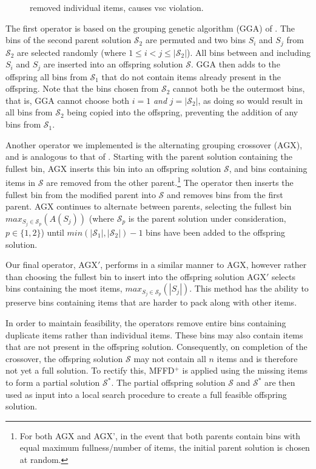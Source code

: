 \documentclass[authoryear]{elsarticle}
\begin{document}
\begin{figure}[H]	
	\centering
	
	\caption{removed individual items, causes vsc violation.}	
	\label{fig:eavsc}
\end{figure}

The first operator is based on the grouping genetic algorithm (GGA) of \citet{falkenauer1992}. The bins of the second parent solution $\mathcal{S}_2$ are permuted and two bins $S_i$ and $S_j$ from $\mathcal{S}_2$ are selected randomly (where $1 \leq i < j \leq |\mathcal{S}_2|$). All bins between and including $S_i$ and $S_j$ are inserted into an offspring solution $\mathcal{S}$. GGA then adds to the offspring all bins from $\mathcal{S}_1$ that do not contain items already present in the offspring. Note that the bins chosen from $\mathcal{S}_2$ cannot both be the outermost bins, that is, GGA cannot choose both $i = 1$ \emph{and} $j = |\mathcal{S}_2|$, as doing so would result in all bins from $\mathcal{S}_2$ being copied into the offspring, preventing the addition of any bins from $\mathcal{S}_1$. 

Another operator we implemented is the alternating grouping crossover (AGX), and is analogous to that of \citet{quiroz2015}. Starting with the parent solution containing the fullest bin, AGX inserts this bin into an offspring solution $\mathcal{S}$, and bins containing items in $\mathcal{S}$ are removed from the other parent.\footnote{For both AGX and AGX', in the event that both parents contain bins with equal maximum fullness/number of items, the initial parent solution is chosen at random.} The operator then inserts the fullest bin from the modified parent into $\mathcal{S}$ and removes bins from the first parent. AGX continues to alternate between parents, selecting the fullest bin $max_{S_j \in \mathcal{S}_p} (A(S_j))$ (where $\mathcal{S}_p$ is the parent solution under consideration, $p \in \{1,2\}$) until $min (|\mathcal{S}_1|,|\mathcal{S}_2|) - 1$ bins have been added to the offspring solution. 

Our final operator, AGX$'$, performs in a similar manner to AGX, however rather than choosing the fullest bin to insert into the offspring solution AGX$'$ selects bins containing the most items, $max_{S_j \in \mathcal{S}_p} (|S_j|)$. This method has the ability to preserve bins containing items that are harder to pack along with other items. 

In order to maintain feasibility, the operators remove entire bins containing duplicate items rather than individual items. These bins may also contain items that are not present in the offspring solution. Consequently, on completion of the crossover, the offspring solution $\mathcal{S}$ may not contain all $n$ items and is therefore not yet a full solution. To rectify this, MFFD$^+$ is applied using the missing items to form a partial solution $\mathcal{S}^*$. The partial offspring solution $\mathcal{S}$ and $\mathcal{S}^*$ are then used as input into a local search procedure to create a full feasible offspring solution.
\end{document}
